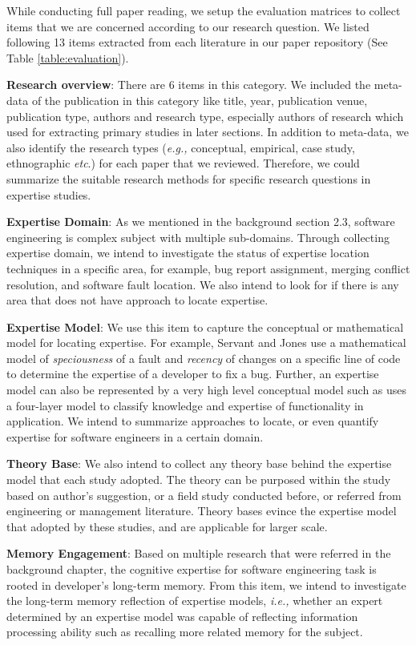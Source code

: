 While conducting full paper reading, we setup the evaluation matrices to collect items that we are concerned according to our research question. We listed following 13 items extracted from each literature in our paper repository (See Table \ref{table:evaluation}).

\textbf{Research overview}: There are 6 items in this category. We included the meta-data of the publication in this category like title, year, publication venue, publication type, authors and research type, especially authors of research which used for extracting primary studies in later sections. In addition to meta-data, we also identify the research types (\textit{e.g.,} conceptual, empirical, case study, ethnographic \textit{etc}.) for each paper that we reviewed. Therefore, we could summarize the suitable research methods for specific research questions in expertise studies.

\textbf{Expertise Domain}: As we mentioned in the background section 2.3, software engineering is complex subject with multiple sub-domains. Through collecting expertise domain, we intend to investigate the status of expertise location techniques in a specific area, for example, bug report assignment, merging conflict resolution, and software fault location. We also intend to look for if there is any area that does not have approach to locate expertise.

\textbf{Expertise Model}: We use this item to capture the conceptual or mathematical model for locating expertise. For example, Servant and Jones \cite{servant2012whosefault} use a mathematical model of \textit{speciousness} of a fault and \textit{recency} of changes on a specific line of code to determine the expertise of a developer to fix a bug. Further, an expertise model can also be represented by a very high level conceptual model such as \cite{Ye2002Supporting} uses a four-layer model to classify knowledge and expertise of functionality in application. We intend to summarize approaches to locate, or even quantify expertise for software engineers in a certain domain.

\textbf{Theory Base}: We also intend to collect any theory base behind the expertise model that each study adopted. The theory can be purposed within the study based on author's suggestion, or a field study conducted before, or referred from engineering or management literature. Theory bases evince the expertise model that adopted by these studies, and  are applicable for larger scale.

\textbf{Memory Engagement}: Based on multiple research that were referred in the background chapter, the cognitive expertise for software engineering task is rooted in developer's long-term memory. From this item, we intend to investigate the long-term memory reflection of expertise models, \textit{i.e.,} whether an expert determined by an expertise model was capable of reflecting information processing ability such as recalling more related memory for the subject.

